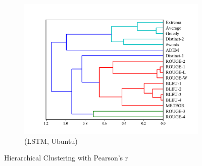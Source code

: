 \begin{figure}[htb]
\begin{subfigure}{0.40\linewidth}
        \includegraphics[width=\linewidth]{figure/plot/hierarchy/v2/pearson/lstm/ubuntu/plot.pdf}
        \caption{(LSTM, Ubuntu)}
    \end{subfigure}
    \centering
    \caption{Hierarchical Clustering with Pearson's r}
    \label{fig:hierarchy}
\end{figure}
